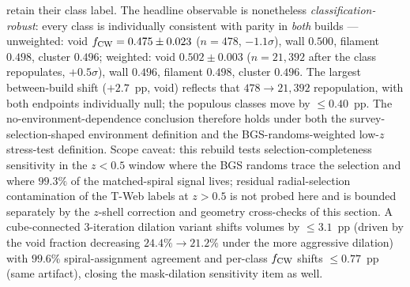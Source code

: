 \documentclass[aps,prd,twocolumn,superscriptaddress,showpacs,preprintnumbers,nofootinbib,longbibliography,floatfix]{revtex4-2}
\begin{document}
retain their class label. The headline observable is nonetheless
\emph{classification-robust}: every class is individually consistent
with parity in \emph{both} builds --- unweighted: void
$f_{\rm CW} = 0.475 \pm 0.023$ ($n=478$, $-1.1\sigma$), wall $0.500$,
filament $0.498$, cluster $0.496$; weighted: void $0.502 \pm 0.003$
($n = 21{,}392$ after the class repopulates, $+0.5\sigma$), wall
$0.496$, filament $0.498$, cluster $0.496$. The largest between-build
shift ($+2.7$~pp, void) reflects that $478 \to 21{,}392$ repopulation,
with both endpoints individually null; the populous classes move by
$\le 0.40$~pp. The no-environment-dependence conclusion therefore holds
under both the survey-selection-shaped environment definition and the
BGS-randoms-weighted low-$z$ stress-test definition. Scope caveat: this rebuild tests
selection-completeness sensitivity in the $z<0.5$ window where the BGS
randoms trace the selection and where $99.3\%$ of the matched-spiral
signal lives; residual radial-selection contamination of the T-Web
labels at $z>0.5$ is not probed here and is bounded separately by the
$z$-shell correction and geometry cross-checks of this section. A
cube-connected 3-iteration dilation variant shifts volumes by
$\le 3.1$~pp (driven by the void fraction decreasing
$24.4\% \to 21.2\%$ under the more aggressive dilation) with $99.6\%$
spiral-assignment agreement and per-class $f_{\rm CW}$ shifts
$\le 0.77$~pp (same artifact), closing the mask-dilation sensitivity
item as well.
\end{document}
